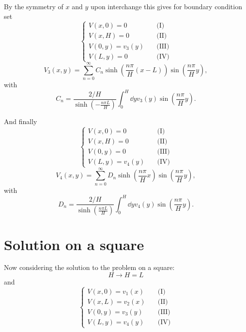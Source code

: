 \documentclass{report}
\begin{document}
  By the symmetry of $x$ and $y$ upon interchange this gives for boundary condition set
  \begin{equation}
    \begin{cases}
      V(x,0) = 0 &\quad \text{(I)}\\
      V(x,H) = 0 &\quad \text{(II)}\\
      V(0,y) = v_3(y) &\quad \text{(III)}\\
      V(L,y) = 0 &\quad \text{(IV)}
    \end{cases}
  \end{equation}
  \begin{equation}
    \boxed{V_3(x,y) = \sum_{n=0}^\infty C_{n} \sinh(\frac{n\pi}{H} (x - L)) \sin(\frac{n\pi}{H}y)},
  \end{equation}
  with
  \begin{equation}
    \boxed{C_{n} = \frac{2/H}{\sinh(-\frac{n\pi L}{H})}  \int_0^H \dd{y} v_3(y) \sin(\frac{n\pi}{H}y)}.
  \end{equation}

  And finally
  \begin{equation}
    \begin{cases}
      V(x,0) = 0 &\quad \text{(I)}\\
      V(x,H) = 0 &\quad \text{(II)}\\
      V(0,y) = 0 &\quad \text{(III)}\\
      V(L,y) = v_4(y) &\quad \text{(IV)}
    \end{cases}
  \end{equation}
  \begin{equation}
    \boxed{V_4(x,y) = \sum_{n=0}^\infty D_{n} \sinh(\frac{n\pi}{H} x) \sin(\frac{n\pi}{H}y)},
  \end{equation}
  with
  \begin{equation}
    \boxed{D_{n} = \frac{2/H}{\sinh(\frac{n\pi L}{H})}  \int_0^H \dd{y} v_4(y) \sin(\frac{n\pi}{H}y)}.
  \end{equation}

\section{Solution on a square}
  Now considering the solution to the problem on a square:
  \begin{equation}
    H \to H = L
  \end{equation}
  and
  \begin{equation}
    \begin{cases}
      V(x,0) = v_1(x) &\quad \text{(I)}\\
      V(x,L) = v_2(x) &\quad \text{(II)}\\
      V(0,y) = v_3(y) &\quad \text{(III)}\\
      V(L,y) = v_4(y) &\quad \text{(IV)}
    \end{cases}
  \end{equation}
\end{document}
